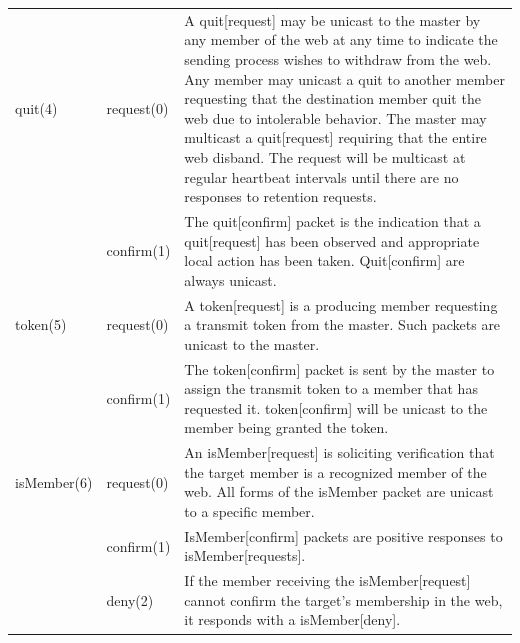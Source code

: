 \documentclass[11pt]{article}
\begin{document}
\begin{center}
\begin{longtable}{llp{}}
   quit(4)  & request(0) & A quit[request] may be unicast to the master
                           by any member of the web at any time to
                           indicate the sending process wishes to
                           withdraw from the web. Any member may unicast
                           a quit to another member requesting that the
                           destination member quit the web due to
                           intolerable behavior.  The master may
                           multicast a quit[request] requiring that the
                           entire web disband. The request will be
                           multicast at regular heartbeat intervals
                           until there are no responses to retention
                           requests. \\

            & confirm(1) & The quit[confirm] packet is the indication
                           that a quit[request] has been observed and
                           appropriate local action has been taken.
                           Quit[confirm] are always unicast. \\

   token(5) & request(0) & A token[request] is a producing member
                           requesting a transmit token from the master.
                           Such packets are unicast to the master. \\

            & confirm(1) & The token[confirm] packet is sent by the
                           master to assign the transmit token to a
                           member that has requested it. token[confirm]
                           will be unicast to the member being granted
                           the token. \\

   isMember(6)&request(0)& An isMember[request] is soliciting
                           verification that the target member is a
                           recognized member of the web. All forms of
                           the isMember packet are unicast to a specific
                           member. \\

            & confirm(1) & IsMember[confirm] packets are positive
                           responses to isMember[requests]. \\

            & deny(2)    & If the member receiving the isMember[request]
                           cannot confirm the target's membership in the
                           web, it responds with a isMember[deny].
\end{longtable}
\end{center}
\end{document}
